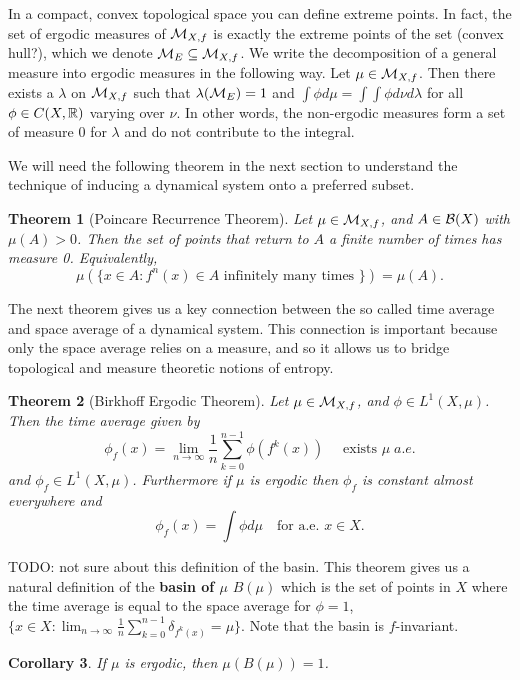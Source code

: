 \documentclass[11pt, reqno]{amsart}
\theoremstyle{plain}
\newtheorem{thm}{Theorem}[section]
\numberwithin{thm}{subsection}
\newtheorem{cor}[thm]{Corollary}
\theoremstyle{definition}
\begin{document}
In a compact, convex topological space you can define extreme points. In fact, the set of ergodic measures of $\mathcal{M}_{X,f}$ is exactly the extreme points of the set (convex hull?), which we denote $\mathcal{M}_E \subseteq \mathcal{M}_{X,f}$. We write the decomposition of a general measure into ergodic measures in the following way. Let $\mu \in \mathcal{M}_{X,f}$. Then there exists a $\lambda$ on $\mathcal{M}_{X,f}$ such that $\lambda(\mathcal{M}_E) = 1$ and $\int \phi d\mu = \int \int \phi d\nu d\lambda$ for all $\phi \in C(X, \mathbb{R})$ varying over $\nu$. In other words, the non-ergodic measures form a set of measure 0 for $\lambda$ and do not contribute to the integral.

We will need the following theorem in the next section to understand the technique of inducing a dynamical system onto a preferred subset.
\begin{thm}[Poincare Recurrence Theorem]
  Let $\mu \in \mathcal{M}_{X,f}$, and $A \in \mathcal{B}(X)$ with $\mu(A) > 0$. Then the set of points that return to $A$ a finite number of times has measure 0. Equivalently, 
  $$\mu(\{x \in A : f^n(x) \in A \text{ infinitely many times }\}) = \mu(A).$$
\end{thm}

The next theorem gives us a key connection between the so called time average and space average of a dynamical system. This connection is important because only the space average relies on a measure, and so it allows us to bridge topological and measure theoretic notions of entropy.
\begin{thm}[Birkhoff Ergodic Theorem]
  Let $\mu \in \mathcal{M}_{X,f}$, and $\phi \in L^1(X,\mu)$. Then the time average given by 
  $$\phi_f(x) = \lim_{n \rightarrow \infty} \frac{1}{n}\sum_{k=0}^{n-1} \phi(f^k(x))\quad\text{ exists }\mu\;a.e.$$
  and $\phi_f \in L^1(X,\mu)$. Furthermore if $\mu$ is ergodic then $\phi_f$ is constant almost everywhere and 
  $$\phi_f(x) = \int \phi d\mu \quad \text{for a.e. }x \in X.$$
\end{thm}

TODO: not sure about this definition of the basin. This theorem gives us a natural definition of the \textbf{basin of $\mu$} $B(\mu)$ which is the set of points in $X$ where the time average is equal to the space average for $\phi = 1$, $\{x \in X : \lim_{n\rightarrow \infty} \frac{1}{n}\sum_{k=0}^{n-1}\delta_{f^k(x)} = \mu\}$. Note that the basin is $f$-invariant.
\begin{cor}
  If $\mu$ is ergodic, then $\mu(B(\mu)) = 1$.
\end{cor}
\end{document}
